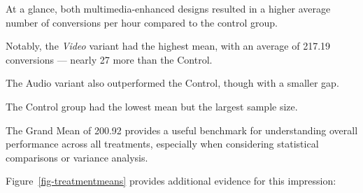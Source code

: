\documentclass[
  letterpaper,
  DIV=11,
  numbers=noendperiod]{scrartcl}
\begin{document}
At a glance, both multimedia-enhanced designs resulted in a higher
average number of conversions per hour compared to the control group.

Notably, the \emph{Video} variant had the highest mean, with an average
of 217.19 conversions --- nearly 27 more than the Control.

The Audio variant also outperformed the Control, though with a smaller
gap.

The Control group had the lowest mean but the largest sample size.

The Grand Mean of 200.92 provides a useful benchmark for understanding
overall performance across all treatments, especially when considering
statistical comparisons or variance analysis.

Figure~\ref{fig-treatmentmeans} provides additional evidence for this
impression:
\end{document}
